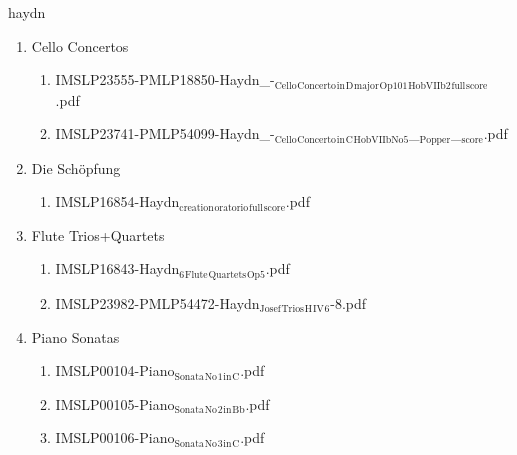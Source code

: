\documentclass[11pt]{article}
\begin{document}
\item haydn
\label{sec-1-1-1-1-44-38}
\begin{enumerate}
\item Cello Concertos
\label{sec-1-1-1-1-44-38-1}
\begin{enumerate}
\item IMSLP23555-PMLP18850-Haydn\_-$_{\text{Cello}}$$_{\text{Concerto}}$$_{\text{in}}$$_{\text{D}}$$_{\text{major}}$$_{\text{Op101}}$$_{\text{HobVIIb2}}$$_{\text{full}}$$_{\text{score}}$.pdf
\label{sec-1-1-1-1-44-38-1-1}

\item IMSLP23741-PMLP54099-Haydn\_-$_{\text{Cello}}$$_{\text{Concerto}}$$_{\text{in}}$$_{\text{C}}$$_{\text{HobVIIbNo5}}$\_$_{\text{Popper}}$\_$_{\text{score}}$.pdf
\label{sec-1-1-1-1-44-38-1-2}
\end{enumerate}

\item Die Schöpfung
\label{sec-1-1-1-1-44-38-2}
\begin{enumerate}
\item IMSLP16854-Haydn$_{\text{creation}}$$_{\text{oratorio}}$$_{\text{full}}$$_{\text{score}}$.pdf
\label{sec-1-1-1-1-44-38-2-1}
\end{enumerate}

\item Flute Trios+Quartets
\label{sec-1-1-1-1-44-38-3}
\begin{enumerate}
\item IMSLP16843-Haydn$_{\text{6}}$$_{\text{Flute}}$$_{\text{Quartets}}$$_{\text{Op5}}$.pdf
\label{sec-1-1-1-1-44-38-3-1}

\item IMSLP23982-PMLP54472-Haydn$_{\text{Josef}}$$_{\text{Trios}}$$_{\text{H}}$$_{\text{IV}}$$_{\text{6}}$-8.pdf
\label{sec-1-1-1-1-44-38-3-2}
\end{enumerate}

\item Piano Sonatas
\label{sec-1-1-1-1-44-38-4}
\begin{enumerate}
\item IMSLP00104-Piano$_{\text{Sonata}}$$_{\text{No}}$$_{\text{1}}$$_{\text{in}}$$_{\text{C}}$.pdf
\label{sec-1-1-1-1-44-38-4-1}

\item IMSLP00105-Piano$_{\text{Sonata}}$$_{\text{No}}$$_{\text{2}}$$_{\text{in}}$$_{\text{Bb}}$.pdf
\label{sec-1-1-1-1-44-38-4-2}

\item IMSLP00106-Piano$_{\text{Sonata}}$$_{\text{No}}$$_{\text{3}}$$_{\text{in}}$$_{\text{C}}$.pdf
\label{sec-1-1-1-1-44-38-4-3}


\end{enumerate}
\end{enumerate}
\end{document}
